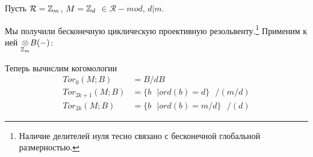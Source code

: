 \documentclass[../hw_main.tex]{subfiles}
\begin{document}
\begin{to_ex}
Пусть $\mathcal{R} = \mathbb{Z}_m$, $M = \mathbb{Z}_d$ $\in\mathcal{R}-mod$, $d|m$. 
\bee
{}
\eee
Мы получили бесконечную циклическую проективную резольвенту.\footnote{Наличие делителей нуля тесно связано с бесконечной глобальной размерностью.} Применим к ней $\underset{\mathbb{Z}_m}{\otimes}B (-)$:
\bee
{}
\eee
Теперь вычислим когомологии
\begin{align*}
    Tor_0(M; B) &= B / dB\\
    Tor_{2k+1}(M; B) &=  \lbrace b \text{ }| ord(b)=d \rbrace \text{ }/ (m/d)  \\
    Tor_{2k}(M; B) &=  \lbrace b \text{ }| ord(b)= m/d \rbrace \text{ }/ (d)
\end{align*}
\end{to_ex}
\end{document}
